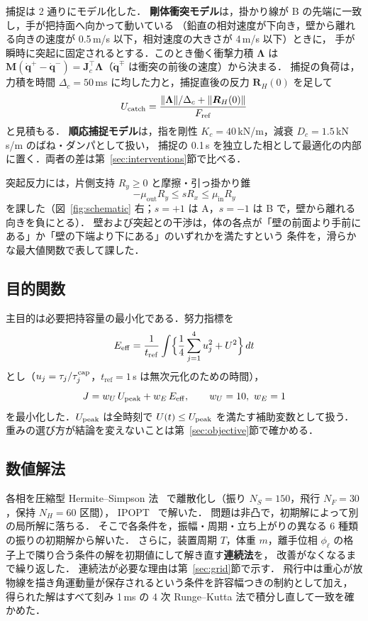 捕捉は 2 通りにモデル化した．
\textbf{剛体衝突モデル}は，掛かり線が B の先端に一致し，手が把持面へ向かって動いている
（鉛直の相対速度が下向き，壁から離れる向きの速度が 0.5\,m/s 以下，相対速度の大きさが 4\,m/s 以下）ときに，
手が瞬時に突起に固定されるとする．このとき働く衝撃力積 $\bm\Lambda$ は
$\bm M(\dot{\bm q}^+-\dot{\bm q}^-)=\bm J_c^\top\bm\Lambda$（$\dot{\bm q}^\mp$ は衝突の前後の速度）から決まる．
捕捉の負荷は，力積を時間 $\Delta_c=50$\,ms に均した力と，捕捉直後の反力 $\bm R_H(0)$ を足して
\begin{equation}
U_{\mathrm{catch}}=\frac{\|\bm\Lambda\|/\Delta_c+\|\bm R_H(0)\|}{F_{\mathrm{ref}}}
\end{equation}
と見積もる．
\textbf{順応捕捉モデル}は，指を剛性 $K_c=40$\,kN/m，減衰 $D_c=1.5$\,kN\,s/m のばね・ダンパとして扱い，
捕捉の 0.1\,s を独立した相として最適化の内部に置く．両者の差は第~\ref{sec:interventions}節で比べる．

突起反力には，片側支持 $R_y\ge0$ と摩擦・引っ掛かり錐
\begin{equation}
-\mu_{\mathrm{out}}R_y\le sR_x\le\mu_{\mathrm{in}}R_y
\end{equation}
を課した（図~\ref{fig:schematic} 右；$s=+1$ は A，$s=-1$ は B で，壁から離れる向きを負にとる）．
壁および突起との干渉は，体の各点が「壁の前面より手前にある」か「壁の下端より下にある」のいずれかを満たすという
条件を，滑らかな最大値関数で表して課した．

\subsection{目的関数}
主目的は必要把持容量の最小化である．努力指標を
\begin{equation}
E_{\mathrm{eff}}=\frac{1}{t_{\mathrm{ref}}}\int\Bigl\{\frac14\sum_{j=1}^{4}u_j^2+U^2\Bigr\}\,dt
\label{eq:effort}
\end{equation}
とし（$u_j=\tau_j/\tau^{\mathrm{cap}}_j$，$t_{\mathrm{ref}}=1$\,s は無次元化のための時間），
\begin{equation}
J=w_U\,U_{\mathrm{peak}}+w_E\,E_{\mathrm{eff}},\qquad w_U=10,\ w_E=1
\label{eq:objective}
\end{equation}
を最小化した．$U_{\mathrm{peak}}$ は全時刻で $U(t)\le U_{\mathrm{peak}}$ を満たす補助変数として扱う．
重みの選び方が結論を変えないことは第~\ref{sec:objective}節で確かめる．

\subsection{数値解法}
各相を圧縮型 Hermite--Simpson 法~\cite{hargraves1987,kelly2017} で離散化し（振り $N_S=150$，飛行 $N_F=30$，保持 $N_H=60$ 区間），
IPOPT~\cite{wachter2006} で解いた．
問題は非凸で，初期解によって別の局所解に落ちる．
そこで各条件を，振幅・周期・立ち上がりの異なる 6 種類の振りの初期解から解いた．
さらに，装置周期 $T$，体重 $m$，離手位相 $\phi_\ell$ の格子上で隣り合う条件の解を初期値にして解き直す\textbf{連続法}を，
改善がなくなるまで繰り返した．
連続法が必要な理由は第~\ref{sec:grid}節で示す．
飛行中は重心が放物線を描き角運動量が保存されるという条件を許容幅つきの制約として加え，
得られた解はすべて刻み 1\,ms の 4 次 Runge--Kutta 法で積分し直して一致を確かめた．


